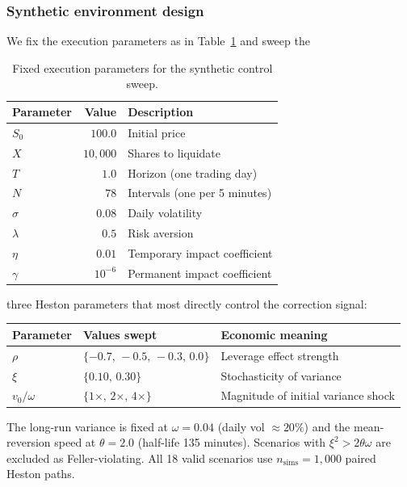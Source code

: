 \documentclass[11pt]{article}
\begin{document}
\subsubsection*{Synthetic environment design}

We fix the execution parameters as in Table~\ref{tab:base_params} and sweep the

\begin{table}[h]
\centering
\begin{tabular}{lrl}
\toprule
Parameter & Value & Description \\
\midrule
$S_0$ & $100.0$   & Initial price \\
$X$   & $10{,}000$ & Shares to liquidate \\
$T$   & $1.0$     & Horizon (one trading day) \\
$N$   & $78$      & Intervals (one per 5 minutes) \\
$\sigma$ & $0.08$ & Daily volatility \\
$\lambda$& $0.5$  & Risk aversion \\
$\eta$ & $0.01$   & Temporary impact coefficient \\
$\gamma$ & $10^{-6}$ & Permanent impact coefficient \\
\bottomrule
\end{tabular}
\caption{Fixed execution parameters for the synthetic control sweep.}
\label{tab:base_params}
\end{table}

three Heston parameters that most directly control the correction signal:

\begin{center}
\begin{tabular}{lll}
\toprule
Parameter & Values swept & Economic meaning \\
\midrule
$\rho$ & $\{-0.7,\,-0.5,\,-0.3,\,0.0\}$ & Leverage effect strength \\
$\xi$ & $\{0.10,\,0.30\}$ & Stochasticity of variance \\
$v_0/\omega$ & $\{1\times,\,2\times,\,4\times\}$ & Magnitude of initial variance shock \\
\bottomrule
\end{tabular}
\end{center}

\noindent
The long-run variance is fixed at $\omega = 0.04$ (daily vol $\approx 20\%$) and the
mean-reversion speed at $\theta = 2.0$ (half-life 135 minutes).
Scenarios with $\xi^2 > 2\theta\omega$ are excluded as Feller-violating.
All 18 valid scenarios use $n_\text{sims} = 1{,}000$ paired Heston paths.
\end{document}
